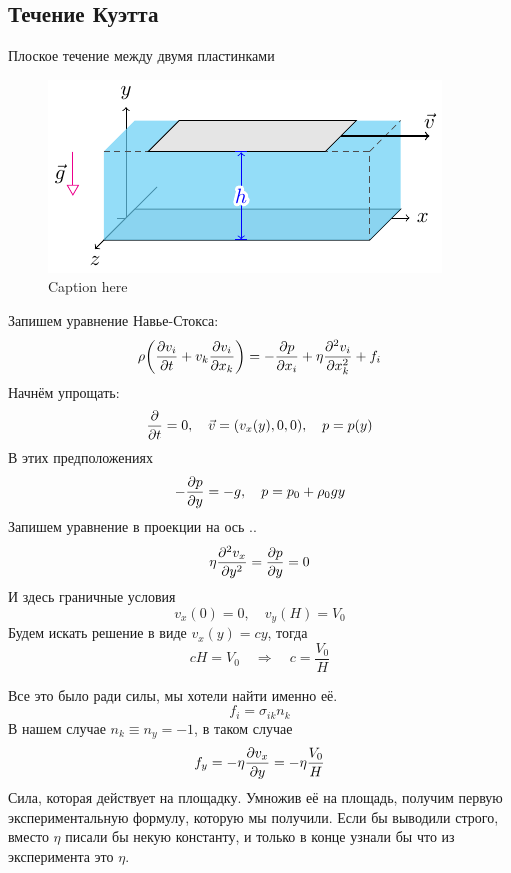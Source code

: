 \subsection{Течение Куэтта}
Плоское течение между двумя пластинками 
\begin{figure}[h!]
    \centering
    \includegraphics[scale=1.5]{img/kuett}
    \caption{Caption here}
    \label{fig:figure1}
\end{figure}

Запишем уравнение Навье-Стокса:
\begin{equation}
    \rho\qty(
        \pdv{v_i}{t}+v_k\pdv{v_i}{x_k}
    )=
    -\pdv{p}{x_i}+\eta\pdv[2]{v_i}{x_k}+f_i
\end{equation}
Начнём упрощать:
\begin{equation}
    \pdv{t} = 0,\quad
    \vec{v} = \qty(v_x (y),0,0), \quad
    p = p(y)
\end{equation}
В этих предположениях 
\begin{equation}
    -\pdv{p}{y} = -g, \quad
    p = p_0 + \rho_0 g y
\end{equation}
Запишем уравнение в проекции на ось ..
\begin{equation}
    \eta\pdv[2]{v_x}{y} = \pdv{p}{y} = 0
\end{equation}
И здесь граничные условия
\begin{equation}
    v_x (0) = 0, \quad
    v_y (H) = V_0
\end{equation}
Будем искать решение в виде $v_x (y) = cy$, тогда
\begin{equation}
    cH = V_0 \quad \Rightarrow \quad c= \frac{V_0}{H}
\end{equation}

Все это было ради силы, мы хотели найти именно её.
\begin{equation}
    f_i = \sigma_{ik} n_k 
\end{equation}
В нашем случае $n_k \equiv n_y = -1$, в таком случае
\begin{equation}
    f_y = -\eta \pdv{v_x}{y}= -\eta \frac{V_0}{H}
\end{equation}
Сила, которая действует на площадку. Умножив её на площадь, получим первую экспериментальную формулу, которую мы получили. Если
бы выводили строго, вместо $\eta$ писали бы некую константу, и
только в конце узнали бы что из эксперимента это $\eta$.

